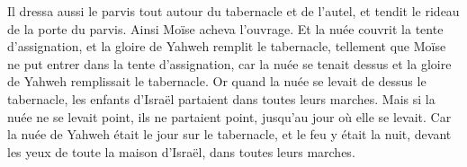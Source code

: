\begin{multicols}{2}
Il dressa aussi le parvis tout autour du tabernacle et de l'autel, et tendit le rideau de la porte du parvis. Ainsi Moïse acheva l'ouvrage.
Et la nuée couvrit la tente d'assignation, et la gloire de Yahweh remplit le tabernacle,
tellement que Moïse ne put entrer dans la tente d'assignation, car la nuée se tenait dessus et la gloire de Yahweh remplissait le tabernacle.
 Or quand la nuée se levait de dessus le tabernacle, les enfants d'Israël partaient dans toutes leurs marches.
Mais si la nuée ne se levait point, ils ne partaient point, jusqu'au jour où elle se levait.
Car la nuée de Yahweh était le jour sur le tabernacle, et le feu y était la nuit, devant les yeux de toute la maison d'Israël, dans toutes leurs marches.
\PPE
\end{multicols}
